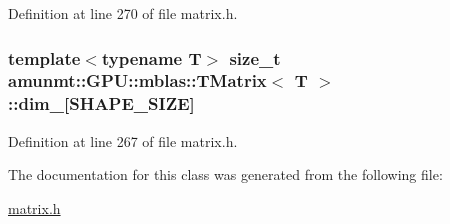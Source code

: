 Definition at line 270 of file matrix.\+h.

\subsubsection[{\texorpdfstring{dim\+\_\+}{dim_}}]{\setlength{\rightskip}{0pt plus 5cm}template$<$typename T$>$ size\+\_\+t {\bf amunmt\+::\+G\+P\+U\+::mblas\+::\+T\+Matrix}$<$ T $>$\+::dim\+\_\+\mbox{[}{\bf S\+H\+A\+P\+E\+\_\+\+S\+I\+ZE}\mbox{]}\hspace{0.3cm}{\ttfamily [private]}}\hypertarget{classamunmt_1_1GPU_1_1mblas_1_1TMatrix_ad9811151546f114cf3f55c80f384087e}{}\label{classamunmt_1_1GPU_1_1mblas_1_1TMatrix_ad9811151546f114cf3f55c80f384087e}


Definition at line 267 of file matrix.\+h.



The documentation for this class was generated from the following file\+:\begin{DoxyCompactItemize}
\item 
\hyperlink{matrix_8h}{matrix.\+h}\end{DoxyCompactItemize}
